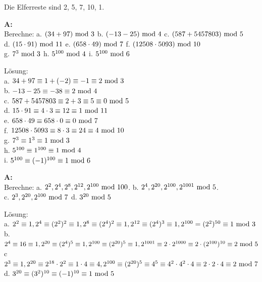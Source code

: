 \documentclass[landscape,twocolumn,a4paper]{article}
\begin{document}
Die Elferreste sind 2, 5, 7, 10, 1.
\bigskip {}
 
 \textbf{A:}   \\
Berechne:
a. $(34 + 97) \text{ mod } 3$ \quad b. $(-13-25) \text{ mod } 4$ \quad c. $(587 + 5 457 803) \text{ mod } 5$ \\
d. $(15 \cdot 91) \text{ mod } 11$  \quad e. $(658 \cdot 49) \text{ mod } 7$ \quad f. $(12508 \cdot 5093) \text{ mod } 10$ \\
g. $7^3\text{ mod } 3$  \quad h. $5^{100}\text{ mod } 4$ \quad i. $5^{100}\text{ mod } 6$
\bigskip {}

Lösung: \\
a.  $34 + 97 \equiv 1 + (-2) \equiv -1 \equiv 2 \text{ mod } 3 $ \\
b.  $-13-25  \equiv -38 \equiv 2 \text{ mod } 4$ \\
c.  $587 + 5 457 803 \equiv 2 + 3 \equiv 5 \equiv 0 \text{ mod } 5$ \\
d.  $15 \cdot 91 \equiv 4 \cdot 3 \equiv 12 \equiv 1 \text{ mod } 11$\\
e. $658 \cdot 49 \equiv 658 \cdot 0 \equiv 0 \text{ mod } 7$ \\
 f. $12508 \cdot 5093 \equiv 8 \cdot 3 \equiv 24 \equiv 4 \text{ mod } 10$ \\
 g. $7^3 \equiv 1^3 \equiv 1 \text{ mod } 3$ \\
 h. $5^{100} \equiv 1^{100} \equiv 1 \text{ mod } 4$ \\
 i. $5^{100}\equiv (-1)^{100} \equiv 1 \text{ mod } 6$
 
 
\textbf{A:}   \\
Berechne: a. $2^2, 2^4, 2^8, 2^{12}, 2^{100} \text{ mod } 100$. \quad b. $2^4,2^{20},2^{100},2^{1001} \text{ mod } 5$. \\
c. $2^3, 2^{20}, 2^{100} \text{ mod } 7$ \quad d. $3^{20} \text{ mod } 5$
\bigskip {}

Lösung: \\
a. $2^2 \equiv 1, 2^4 \equiv (2^2)^2 \equiv 1, 2^8 \equiv (2^4)^2 \equiv 1, 2^{12} \equiv (2^4)^3 \equiv 1, 2^{100} = (2^2)^{50}\equiv 1 \text{ mod } 3$ \\
b. $2^4 \equiv 16 \equiv 1, 2^{20} \equiv (2^4)^5 \equiv 1, 2^{100} \equiv (2^{20})^5 \equiv 1, 2^{1001} \equiv 2 \cdot 2^{1000} \equiv 2 \cdot (2^{100})^{10} \equiv 2 \text{ mod } 5$ \\
c $2^3 \equiv 1, 2^{20} \equiv 2^ {18} \cdot 2^2 \equiv 1 \cdot 4 \equiv 4, 2^{100} \equiv (2^{20})^5 \equiv
4^5 \equiv 4^2 \cdot 4^2 \cdot 4 \equiv 2 \cdot 2 \cdot 4 \equiv 2 \text{ mod } 7$ \\
d.  $3^{20} \equiv (3^2)^{10} \equiv (-1)^{10} \equiv 1 \text{ mod } 5$ \\
\end{document}
